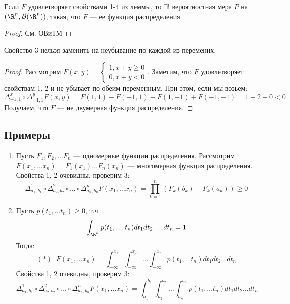 \begin{theorem}
    Если \(F\) удовлетворяет свойствами 1-4 из леммы, то \(\exists !\) вероятностная мера \(P\) на \((\R^n, \mathcal{B}(\R^n))\), такая, что \(F\) --- ее функция распределения
\end{theorem}
\begin{proof}
    См. ОВиТМ
\end{proof}

\begin{note}
    Свойство 3 нельзя заменить на неубывание по каждой из переменнх.
\end{note}
\begin{proof}
    Рассмотрим \(F(x, y) = \left\{\begin{array}{l}
        1, x + y \ge 0 \\
        0, x + y < 0
    \end{array}\right.\).
    Заметим, что \(F\) удовлетворяет свойствам 1, 2 и не убывает по обеим переменным. При этом, если мы возьем:
    \[\Delta^x_{-1, 1} \circ \Delta^y_{-1, 1} F(x, y) = F(1, 1) - F(-1, 1) - F(1, -1) + F(-1, -1) = 1 - 2 + 0 < 0\]
    Получаем, что \(F\) --- не двумерная функция распределения.
\end{proof}

\subsection{Примеры}
\begin{enumerate}
    \item Пусть \(F_1, F_2, \dots F_n\) --- одномерные функции распределения. Рассмотрим \(F(x_1, \dots x_n) = F_1(x_1)\dots F_n(x_n)\) --- многомерная функция распределения. Свойства 1, 2 очевидны, проверим 3:
    \[\Delta_{a_1, b_1}^1 \circ \Delta_{a_2, b_2}^2 \circ \dots \circ \Delta_{a_n, b_n}^n F(x_1, \dots x_n) = \prod_{k = 1}^n (F_k(b_k) - F_k(a_k)) \ge 0\]

    \item Пусть \(p(t_1, \dots t_n) \ge 0\), т.ч.
    \[\int_{\R^n} p(t_1, \dots t_n) dt_1dt_2\dots dt_n = 1\]
    Тогда:
    \[(*)\;\;F(x_1, \dots x_n) = \int_{-\infty}^{x_1}\int_{-\infty}^{x_2}\dots \int_{-\infty}^{x_n} p(t_1, \dots t_n)dt_1dt_2\dots dt_n\]
    Свойства 1, 2 очевидны, проверим 3:
    \[\Delta_{a_1, b_1}^1 \circ \Delta_{a_2, b_2}^2 \circ \dots \circ \Delta_{a_n, b_n}^n F(x_1, \dots x_n) = \int_{a_1}^{b_1}\int_{a_2}^{b_2}\dots \int_{a_n}^{b_n} p(t_1, \dots t_n)dt_1dt_2\dots dt_n\]
\end{enumerate}

